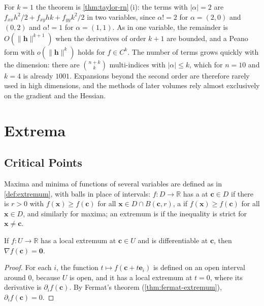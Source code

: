 For $k=1$ the theorem is \cref{thm:taylor-rn}\,(i): the terms with $|\alpha|=2$ are $f_{xx}h^2/2+f_{xy}hk+f_{yy}k^2/2$ in two variables, since $\alpha!=2$ for $\alpha=(2,0)$ and $(0,2)$ and $\alpha!=1$ for $\alpha=(1,1)$. As in one variable, the remainder is $O(\|\mathbf h\|^{k+1})$ when the derivatives of order $k+1$ are bounded, and a Peano form with $o(\|\mathbf h\|^k)$ holds for $f\in C^k$. The number of terms grows quickly with the dimension: there are $\binom{n+k}k$ multi-indices with $|\alpha|\le k$, which for $n=10$ and $k=4$ is already $1001$. Expansions beyond the second order are therefore rarely used in high dimensions, and the methods of later volumes rely almost exclusively on the gradient and the Hessian.

\section{Extrema}
\label{sec:extrema-n}

\subsection{Critical Points}

Maxima and minima of functions of several variables are defined as in \cref{def:extremum}, with balls in place of intervals: $f\colon D\to\mathbb R$ has a  at $\mathbf c\in D$ if there is $r>0$ with $f(\mathbf x)\ge f(\mathbf c)$ for all $\mathbf x\in D\cap B(\mathbf c,r)$, a  if $f(\mathbf x)\ge f(\mathbf c)$ for all $\mathbf x\in D$, and similarly for maxima; an extremum is  if the inequality is strict for $\mathbf x\ne\mathbf c$.

\begin{theorem}
\label{thm:first-order}
If $f\colon U\to\mathbb R$ has a local extremum at $\mathbf c\in U$ and is differentiable at $\mathbf c$, then $\nabla f(\mathbf c)=\mathbf0$.
\end{theorem}

\begin{proof}
For each $i$, the function $t\mapsto f(\mathbf c+t\mathbf e_i)$ is defined on an open interval around $0$, because $U$ is open, and it has a local extremum at $t=0$, where its derivative is $\partial_if(\mathbf c)$. By Fermat's theorem (\cref{thm:fermat-extremum}), $\partial_if(\mathbf c)=0$.
\end{proof}

